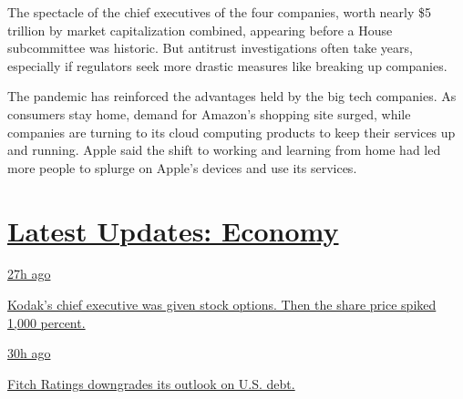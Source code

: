 The spectacle of the chief executives of the four companies, worth
nearly \$5 trillion by market capitalization combined, appearing before
a House subcommittee was historic. But antitrust investigations often
take years, especially if regulators seek more drastic measures like
breaking up companies.

The pandemic has reinforced the advantages held by the big tech
companies. As consumers stay home, demand for Amazon's shopping site
surged, while companies are turning to its cloud computing products to
keep their services up and running. Apple said the shift to working and
learning from home had led more people to splurge on Apple's devices and
use its services.

\hypertarget{latest-updates-economy}{%
\section{\texorpdfstring{\href{https://www.nytimes.com/live/2020/07/31/business/stock-market-today-coronavirus?action=click\&pgtype=Article\&state=default\&region=MAIN_CONTENT_1\&context=storylines_live_updates}{Latest
Updates:
Economy}}{Latest Updates: Economy}}\label{latest-updates-economy}}

\href{https://www.nytimes.com/live/2020/07/31/business/stock-market-today-coronavirus?action=click\&pgtype=Article\&state=default\&region=MAIN_CONTENT_1\&context=storylines_live_updates\#kodaks-chief-executive-was-given-stock-options-then-the-share-price-spiked-1000-percent}{27h
ago}

\href{https://www.nytimes.com/live/2020/07/31/business/stock-market-today-coronavirus?action=click\&pgtype=Article\&state=default\&region=MAIN_CONTENT_1\&context=storylines_live_updates\#kodaks-chief-executive-was-given-stock-options-then-the-share-price-spiked-1000-percent}{Kodak's
chief executive was given stock options. Then the share price spiked
1,000 percent.}

\href{https://www.nytimes.com/live/2020/07/31/business/stock-market-today-coronavirus?action=click\&pgtype=Article\&state=default\&region=MAIN_CONTENT_1\&context=storylines_live_updates\#fitch-ratings-downgrades-its-outlook-on-us-debt}{30h
ago}

\href{https://www.nytimes.com/live/2020/07/31/business/stock-market-today-coronavirus?action=click\&pgtype=Article\&state=default\&region=MAIN_CONTENT_1\&context=storylines_live_updates\#fitch-ratings-downgrades-its-outlook-on-us-debt}{Fitch
Ratings downgrades its outlook on U.S. debt.}

